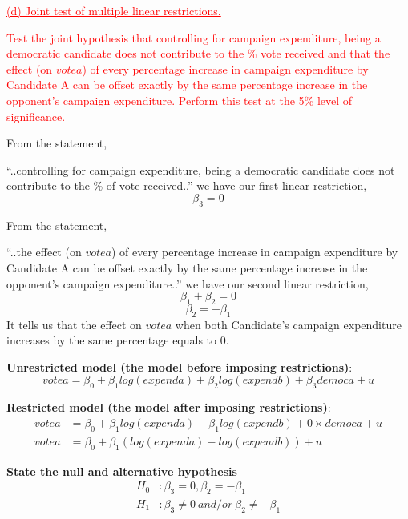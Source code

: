 \documentclass[12pt]{report}
\begin{document}
\newpage
\noindent \textcolor{red}
{
	\uline{(d) Joint test of multiple linear restrictions.}
}

\noindent \textcolor{red}
{
	Test the joint hypothesis that controlling for campaign expenditure, being a democratic candidate does not contribute to the \% vote received and that the effect (on $votea$) of every percentage increase in campaign expenditure by Candidate A can be offset exactly by the same percentage increase in the opponent’s campaign expenditure. Perform this test at the 5\% level of significance.
}

\noindent From the statement,

\centering
“..controlling for campaign expenditure, being a democratic candidate does not contribute to the \% of vote received..”
\vspace{-\baselineskip}
\justify
we have our first linear restriction,
$$\beta_3 = 0$$

\noindent From the statement,

\centering
“..the effect (on $votea$) of every percentage increase in campaign expenditure by Candidate A can be offset exactly by the same percentage increase in the opponent’s campaign expenditure..”
\vspace{-\baselineskip}
\justify
we have our second linear restriction,
$$\beta_1 + \beta_2 = 0$$
$$\beta_2 = -\beta_1$$
\noindent It tells us that the effect on $votea$ when both Candidate's campaign expenditure increases by the same percentage equals to 0.
\vspace{10mm}

\noindent \textbf{Unrestricted model (the model before imposing restrictions)}:
$$votea = \beta_0 + \beta_1log(expenda) + \beta_2log(expendb) + \beta_3democa + u$$

\noindent \textbf{Restricted model (the model after imposing restrictions)}:
\begin{align*}
	votea &= \beta_0 + \beta_1log(expenda) - \beta_1log(expendb) + 0{\times}democa + u \\
	votea &= \beta_0 + \beta_1(log(expenda) - log(expendb)) + u
\end{align*}

\newpage
\noindent \textbf{State the null and alternative hypothesis}
\begin{align*}
	H_0&: \beta_3 = 0, \beta_2 = -\beta_1 \\
	H_1&: \beta_3 \neq 0\ and/or\ \beta_2 \neq -\beta_1
\end{align*}
\end{document}
